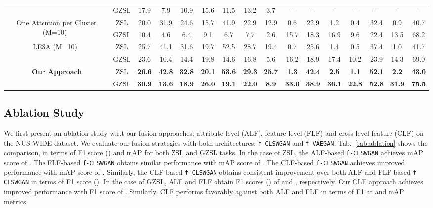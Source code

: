\documentclass[10pt,journal,compsoc]{IEEEtran}
\newcommand{\clswgan}{\texttt{f-CLSWGAN}}
\newcommand{\vaegan}{\texttt{f-VAEGAN}}
\begin{document}
\begin{table*}[t]
{\begin{tabular}{ccccccccc|ccccccc}
 & GZSL & 17.9 & 7.9 & 10.9 & 15.6 & 11.5 & 13.2 & 3.7 & - & - & - & - & - & - & - \\ 
\cmidrule(lr){2-16}
\multirow{2}{*}{One Attention per Cluster (M=10)~\cite{huynh2020shared}} & ZSL & 20.0 & 31.9 & 24.6 & 15.7 & 41.9 & 22.9 & 12.9 & 0.6 & 22.9 & 1.2 & 0.4 & 32.4 & 0.9 & 40.7 \\
 & GZSL & 10.4 & 4.6 & 6.4 & 9.1 & 6.7 & 7.7 & 2.6 & 15.7 & 18.3 & 16.9 & 9.6 & 22.4 & 13.5 & 68.2 \\ 
\cmidrule(lr){2-16}
\multirow{2}{*}{LESA (M=10)~\cite{huynh2020shared}} & ZSL & 25.7 & 41.1 & 31.6 & 19.7 & 52.5 & 28.7 & 19.4 & 0.7 & 25.6 & 1.4 & 0.5 & 37.4 & 1.0 & 41.7 \\
 & GZSL & 23.6 & 10.4 & 14.4 & 19.8 & 14.6 & 16.8 & 5.6 & 16.2 & 18.9 & 17.4 & 10.2 & 23.9 & 14.3 & 69.0 \\ 
\cmidrule(lr){2-16}
\multirow{2}{*}{\textbf{Our Approach}} & ZSL & \textbf{26.6}  & \textbf{42.8}  & \textbf{32.8}  & \textbf{20.1}  & \textbf{53.6}  & \textbf{29.3}  & \textbf{25.7}  & \textbf{1.3} & \textbf{42.4} & \textbf{2.5} & \textbf{1.1}  & \textbf{52.1} & \textbf{2.2} & \textbf{43.0} \\
 & GZSL & \textbf{30.9}  & \textbf{13.6}  & \textbf{18.9}  & \textbf{26.0}  & \textbf{19.1}  & \textbf{22.0}  & \textbf{8.9}  & \textbf{33.6} & \textbf{38.9} & \textbf{36.1} & \textbf{22.8} & \textbf{52.8} & \textbf{31.9} & \textbf{75.5} \\
\bottomrule[0.1em]
\end{tabular}
}
\vspace{-0.12cm}
\label{tab:sota_nuswide_openimages}
\end{table*}








\subsection{Ablation Study\label{sec:ablation}}
We first present an ablation study w.r.t our fusion approaches: attribute-level (ALF), feature-level (FLF) and cross-level feature (CLF) on the NUS-WIDE dataset. We evaluate our fusion strategies with both architectures: \clswgan{} and \vaegan{}. Tab.~\ref{tab:ablation} shows the comparison, in terms of F1 score () and mAP for both ZSL and GZSL tasks. In the case of ZSL, the ALF-based \clswgan{} achieves mAP score of . The FLF-based \clswgan{} obtains similar performance with mAP score of . The CLF-based \clswgan{} achieves improved performance with mAP score of . Similarly, the CLF-based \clswgan{} obtains consistent improvement over both ALF and FLF-based \clswgan{} in terms of F1 score (). In the case of GZSL, ALF and FLF obtain  F1 scores () of  and , respectively. Our CLF approach achieves improved performance with F1 score of . Similarly, CLF performs favorably against both ALF and FLF in terms of F1 at  and mAP metrics.  
\end{document}
